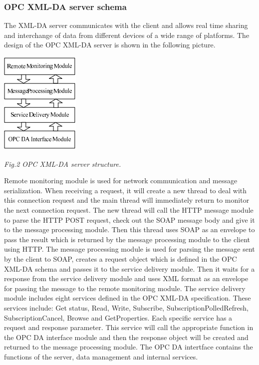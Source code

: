 \documentclass[twosided,a4,10pt]{article}
\begin{document}
\begin{multicols}{2}
	\subsubsection{OPC XML-DA server schema}
	The XML-DA server communicates with the client and allows real time sharing and interchange of data from different devices of a wide range of platforms. The design of the OPC XML-DA server is shown in the following picture.\newline
	\begin{center}
	\includegraphics[scale=0.65]{XML-DA-server.png}
	\end{center}
	\begin{center}
	\textit{Fig.2 OPC XML-DA server structure.}
	\end{center}
	Remote monitoring module is used for network communication and message serialization. When receiving a request, it will create a new thread to deal with this connection request and the main thread will immediately return to monitor the next connection request. The new thread will call the HTTP message module to parse the HTTP POST request, check out the SOAP message body and give it to the message processing module. Then this thread uses SOAP as an envelope to pass the result which is returned by the message processing module to the client using HTTP.\newline
	The message processing module is used for parsing the message sent by the client to SOAP, creates a request object which is defined in the OPC XML-DA schema and passes it to the service delivery module. Then it waits for a response from the service delivery module and uses XML format as an envelope for passing the message to the remote monitoring module.\newline
	The service delivery module includes eight services defined in the OPC XML-DA specification. These services include: Get status, Read, Write, Subscribe, SubscriptionPolledRefresh, SubscriptionCancel, Browse and GetProperties. Each specific service has a request and response parameter. This service will call the appropriate function in the OPC DA interface module and then the response object will be created and returned to the message processing module.\newline
	The OPC DA intertface contains the functions of the server, data management and internal services. 

\end{multicols}
\end{document}
